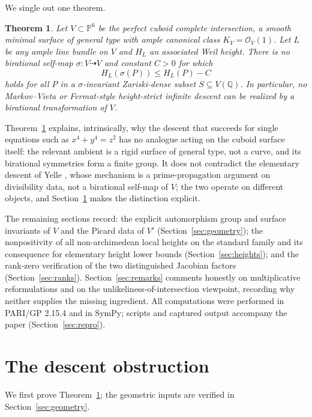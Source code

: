 \documentclass[11pt,reqno]{amsart}
\theoremstyle{plain}
\newtheorem{theorem}{Theorem}[section]
\theoremstyle{definition}
\theoremstyle{remark}
\newcommand{\Q}{\mathbb{Q}}
\newcommand{\PP}{\mathbb{P}}
\begin{document}
We single out one theorem.

\begin{theorem}\label{thm:main}
Let $V\subset\PP^6$ be the perfect cuboid complete intersection, a smooth minimal
surface of general type with ample canonical class $K_V=\mathcal{O}_V(1)$. Let $L$ be
any ample line bundle on $V$ and $H_L$ an associated Weil height. There is no
birational self-map $\sigma\colon V\dashrightarrow V$ and constant $C>0$ for which
\[
H_L(\sigma(P))\le H_L(P)-C
\]
holds for all $P$ in a $\sigma$-invariant Zariski-dense subset $S\subseteq V(\Q)$. In
particular, no Markov--Vieta or Fermat-style height-strict
infinite descent can be realized by a birational transformation of $V$.
\end{theorem}

Theorem~\ref{thm:main} explains, intrinsically, why the descent that succeeds for
single equations such as $x^4+y^4=z^2$ has no analogue acting on the cuboid surface
itself: the relevant ambient is a rigid surface of general type, not a curve, and its
birational symmetries form a finite group. It does not contradict the elementary
descent of Yelle \cite{Yelle}, whose mechanism is a prime-propagation argument on
divisibility data, not a birational self-map of $V$; the two operate on different
objects, and Section~\ref{sec:descent} makes the distinction explicit.

The remaining sections record: the explicit automorphism group and surface invariants
of $V$ and the Picard data of $V'$ (Section~\ref{sec:geometry}); the nonpositivity of
all non-archimedean local heights on the standard family and its consequence for
elementary height lower bounds (Section~\ref{sec:heights}); and the rank-zero
verification of the two distinguished Jacobian factors (Section~\ref{sec:ranks}).
Section~\ref{sec:remarks} comments honestly on multiplicative reformulations and on
the unlikeliness-of-intersection viewpoint, recording why neither supplies the
missing ingredient. All computations were performed in PARI/GP 2.15.4
\cite{PARI} and in SymPy; scripts and captured output accompany the paper
(Section~\ref{sec:repro}).

\section{The descent obstruction}\label{sec:descent}

We first prove Theorem~\ref{thm:main}; the geometric inputs are verified in
Section~\ref{sec:geometry}.
\end{document}
